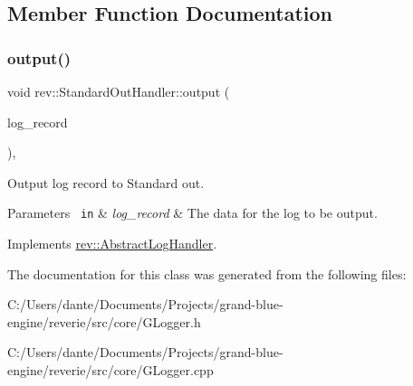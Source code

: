 \subsection{Member Function Documentation}
\mbox{\label{classrev_1_1_standard_out_handler_abba7f654fa04807e85cdb9afd0f2234e}} 
\subsubsection{\texorpdfstring{output()}{output()}}
{\footnotesize\ttfamily void rev\+::\+Standard\+Out\+Handler\+::output (\begin{DoxyParamCaption}\item[{\mbox{\hyperlink{classrev_1_1_log_record}{Log\+Record}} \&}]{log\+\_\+record }\end{DoxyParamCaption})\hspace{0.3cm}{\ttfamily [override]}, {\ttfamily [virtual]}}



Output log record to Standard out. 


\begin{DoxyParams}[1]{Parameters}
\mbox{\texttt{ in}}  & {\em log\+\_\+record} & The data for the log to be output. \\
\hline
\end{DoxyParams}


Implements \mbox{\hyperlink{classrev_1_1_abstract_log_handler_a0154255c9435f0ee66975be2d450b177}{rev\+::\+Abstract\+Log\+Handler}}.



The documentation for this class was generated from the following files\+:\begin{DoxyCompactItemize}
\item 
C\+:/\+Users/dante/\+Documents/\+Projects/grand-\/blue-\/engine/reverie/src/core/G\+Logger.\+h\item 
C\+:/\+Users/dante/\+Documents/\+Projects/grand-\/blue-\/engine/reverie/src/core/G\+Logger.\+cpp\end{DoxyCompactItemize}
